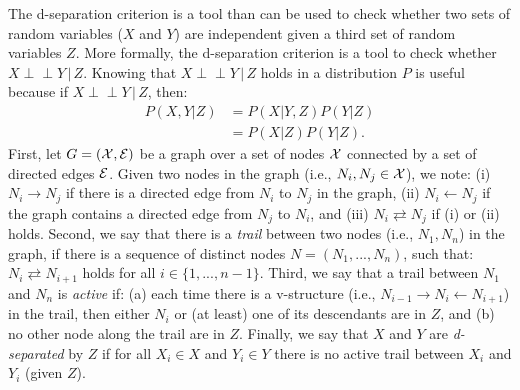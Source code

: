\documentclass[twoside,11pt]{article}
\let\oldmathcal\mathcal
\renewcommand{\mathcal}[1]{%
  \IfSubStr{ABCDEFGHIJKLMNOPQRSTUVWXYZ}{#1}{\oldmathcal{#1}}{\mathdutchcal{#1}}
}
\newcommand{\indep}{\perp \! \! \! \perp}
\begin{document}
The d-separation criterion is a tool than can be used to check whether two sets of random variables ($X$ and $Y$) are independent given a third set of random variables $Z$. More formally, the d-separation criterion is a tool to check whether $X \indep Y\,| \,Z$. Knowing that $X \indep Y\,|\,Z$ holds in a distribution $P$ is useful because if $X \indep Y\,|\,Z$, then:
\begin{align*}
P(X, Y|Z) &= P(X| Y, Z)P(Y|Z) \tag{product-rule}\\
&= P(X|Z)P(Y|Z).\tag{$X \indep Y \,|\, Z$}
\end{align*}
First, let $G = (\mathcal{X}, \mathcal{E})$ be a graph over a set of nodes $\mathcal{X}$ connected by a set of directed edges $\mathcal{E}$. Given two nodes in the graph (i.e., $N_i, N_j \in \mathcal{X}$), we note: (i) $N_i \rightarrow N_j$ if there is a directed edge from $N_i$ to $N_j$ in the graph, (ii) $N_i \leftarrow N_j$ if the graph contains a directed edge from $N_j$ to $N_i$, and (iii) $N_i \rightleftarrows N_j$ if (i) or (ii) holds. Second, we say that there is a \textit{trail} between two nodes (i.e., $N_1, N_n$) in the graph, if there is a sequence of distinct nodes $N = (N_1, ..., N_n)$, such that: $N_i \rightleftarrows N_{i+1}$ holds for all $i \in \{1, ..., n-1\}$. Third, we say that a trail between $N_1$ and $N_n$ is \textit{active} if: (a) each time there is a v-structure (i.e., $N_{i-1} \rightarrow N_i \leftarrow N_{i+1}$) in the trail, then either $N_i$ or (at least) one of its descendants are in $Z$, and (b) no other node along the trail are in $Z$. Finally, we say that $X$ and $Y$ are \textit{d-separated} by $Z$ if for all $X_i \in X$ and $Y_i \in Y$ there is no active trail between $X_i$ and $Y_i$ (given $Z$).
\end{document}
